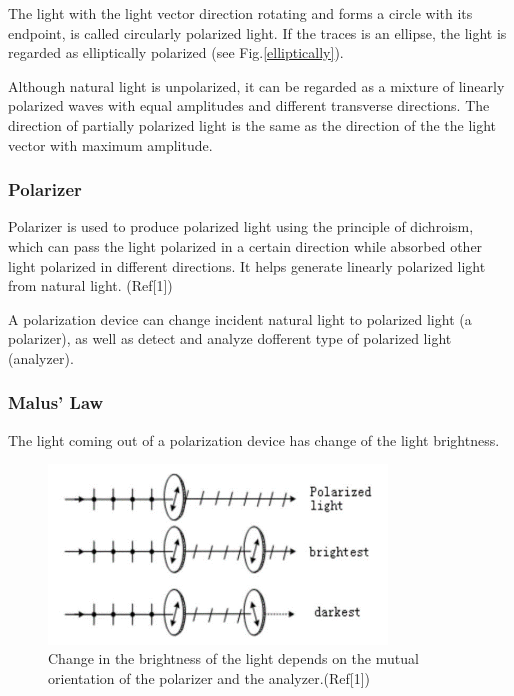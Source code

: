 \documentclass[12pt,a4paper]{article}
\begin{document}
The light with the light vector direction rotating and forms a circle with its endpoint, is called circularly polarized light. If the traces is an ellipse, the light is regarded as elliptically polarized (see Fig.\ref{elliptically}).\par 

Although natural light is unpolarized, it can be regarded as a mixture of linearly polarized waves with equal amplitudes and different transverse directions. The direction of partially polarized light is the same as the direction of the the light vector with maximum amplitude. \par


\subsubsection{Polarizer}
Polarizer is used to produce polarized light using the principle of dichroism, which can pass the light polarized in a certain direction while absorbed other light polarized in different directions. It helps generate linearly polarized light from natural light. (Ref[1])\par 
A polarization device can change incident natural light to polarized light (a polarizer), as well as detect and analyze dofferent type of polarized light (analyzer).

\subsubsection{Malus' Law}
The light coming out of a polarization device has change of the light brightness.

\begin{figure}[H]
    \centering
    \includegraphics[width=9cm]{makustheo.png}
    \caption{ Change in the brightness of the light depends on the mutual orientation of the polarizer and the analyzer.(Ref[1])}
    \label{brightnesschange}
\end{figure}
\end{document}
